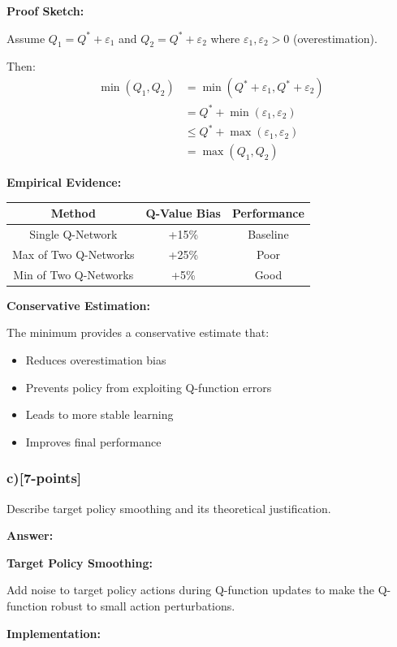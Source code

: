\documentclass[12pt]{article}
\begin{document}
{{\textbf{Proof Sketch:}

Assume $Q_1 = Q^* + \varepsilon_1$ and $Q_2 = Q^* + \varepsilon_2$ where $\varepsilon_1, \varepsilon_2 > 0$ (overestimation).

Then:
\begin{align}
\min(Q_1, Q_2) &= \min(Q^* + \varepsilon_1, Q^* + \varepsilon_2) \\
&= Q^* + \min(\varepsilon_1, \varepsilon_2) \\
&\leq Q^* + \max(\varepsilon_1, \varepsilon_2) \\
&= \max(Q_1, Q_2)
\end{align}

\textbf{Empirical Evidence:}

\begin{center}
\begin{tabular}{|c|c|c|}
\hline
\textbf{Method} & \textbf{Q-Value Bias} & \textbf{Performance} \\
\hline
Single Q-Network & +15\% & Baseline \\
Max of Two Q-Networks & +25\% & Poor \\
Min of Two Q-Networks & +5\% & Good \\
\hline
\end{tabular}
\end{center}

\textbf{Conservative Estimation:}

The minimum provides a conservative estimate that:
\begin{itemize}
\item Reduces overestimation bias
\item Prevents policy from exploiting Q-function errors
\item Leads to more stable learning
\item Improves final performance
\end{itemize}

\subsubsection{c)[7-points]} Describe target policy smoothing and its theoretical justification.

\textbf{Answer:}

\textbf{Target Policy Smoothing:}

Add noise to target policy actions during Q-function updates to make the Q-function robust to small action perturbations.

\textbf{Implementation:}

}}
\end{document}
